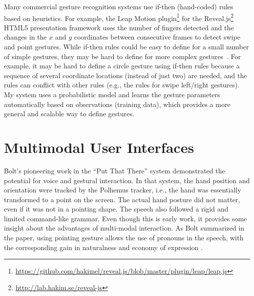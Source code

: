 Many commercial gesture recognition systems use if-then (hand-coded) rules
based on heuristics. For example, the Leap Motion plugin\footnote{\url{https://github.com/hakimel/reveal.js/blob/master/plugin/leap/leap.js}}
for the Reveal.js\footnote{\url{http://lab.hakim.se/reveal-js}} HTML5
presentation framework uses the number of fingers detected and the changes in the $x$ and $y$ coordinates between consecutive
frames to detect swipe and point gestures. While if-then rules could be easy to define for
a small number of simple gestures, they may be hard to define for more complex
gestures~\cite{kinectspace14}.
For example, it may be hard to define a circle gesture using if-then rules
because a sequence of several coordinate locations (instead of just two) are
needed, and the rules can conflict with other rules (e.g., the rules for swipe
left/right gestures). My system uses a probabilistic model and learns the
gesture parameters automatically based on observations (training data), which provides a more general and
scalable way to define gestures.

% 

\section{Multimodal User Interfaces}
Bolt's pioneering work in the ``Put That There'' system \cite{Bolt80} 
demonstrated the potential for voice and gestural interaction.  In that system, 
the hand position and orientation were tracked by the Polhemus tracker, i.e.,
the hand was essentially transformed to a point on the screen. The actual hand 
posture did not matter, even if it was not in a pointing shape. The speech also 
followed a rigid and limited command-like grammar. Even though this is early 
work, it provides some insight about the advantages of multi-modal interaction. 
As Bolt summarized in the paper, using pointing gesture allows the use of 
pronouns in the speech, with the corresponding gain in naturalness and economy 
of expression \cite{Bolt80}.

